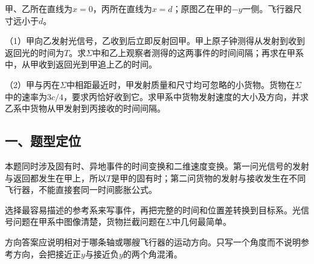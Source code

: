 \documentclass[12pt,a4paper,fontset=fandol]{ctexart}
\begin{document}
甲、乙所在直线为\(x=0\)，丙所在直线为\(x=d\)；原图乙在甲的\(-y\)一侧。飞行器尺寸远小于\(d\)。

\begin{center}
\begin{minipage}{\linewidth}
\centering\begingroup{}
\ifdim\wd\diagrambox>.88\linewidth
\sbox{\diagrambox}{\resizebox{.88\linewidth}{!}{\usebox{\diagrambox}}}\fi
\ifdim\ht\diagrambox>.38\textheight
\resizebox{!}{.38\textheight}{\usebox{\diagrambox}}
\else\usebox{\diagrambox}\fi
\par{}\endgroup\end{minipage}\end{center}

（1）甲向乙发射光信号，乙收到后立即反射回甲。甲上原子钟测得从发射到收到返回光的时间为\(T\)。求\(\Sigma\)中和乙上观察者测得的这两事件的时间间隔；再求在甲系中，从甲收到返回光到甲追上乙的时间。

（2）甲与丙在\(\Sigma\)中相距最近时，甲发射质量和尺寸均可忽略的小货物。货物在\(\Sigma\)中的速率为\(3c/4\)，要求丙恰好收到它。求甲系中货物发射速度的大小及方向，并求乙系中货物从甲发射到丙接收的时间间隔。

\subsection{一、题型定位}\label{ux4e00ux9898ux578bux5b9aux4f4d-4}

本题同时涉及固有时、异地事件的时间变换和二维速度变换。第一问光信号的发射与返回都发生在甲上，所以\(T\)是甲的固有时；第二问货物的发射与接收发生在不同飞行器，不能直接套同一时间膨胀公式。

选择最容易描述的参考系来写事件，再把完整的时间和位置差转换到目标系。光信号问题在甲系中图像清楚，货物拦截问题在\(\Sigma\)中几何最简单。

方向答案应说明相对于哪条轴或哪艘飞行器的运动方向。只写一个角度而不说明参考方向，会把接近正\(y\)与接近负\(y\)的两个角混淆。
\end{document}
